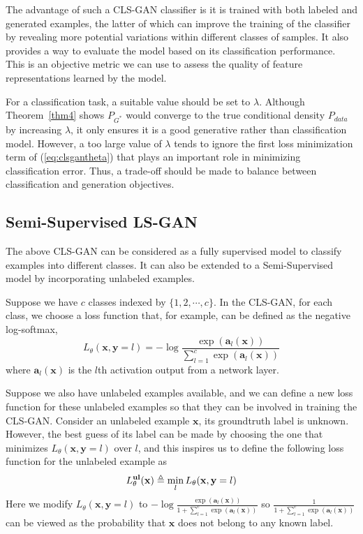 The advantage of such a CLS-GAN classifier is it is trained with both labeled and generated examples, the latter of which can improve the training of the classifier by revealing more potential variations within different classes of samples. It also provides a way to evaluate the model based on its classification performance. This is an objective metric we can use to assess the quality of feature representations learned by the model.

For a classification task, a suitable value should be set to $\lambda$.  Although Theorem~\ref{thm4} shows $P_{G^*}$ would converge to the true conditional density $P_{data}$ by increasing $\lambda$, it only ensures it is a good generative rather than classification model.  However, a too large value of $\lambda$ tends to ignore the first loss minimization term of (\ref{eq:clsgantheta}) that plays an important role in minimizing classification error.  Thus, a trade-off should be made to balance between classification and generation objectives.


\subsection{Semi-Supervised LS-GAN}\label{sec:ssl}
The above CLS-GAN can be considered as a fully supervised model to classify examples into different classes.
It can also be extended to a Semi-Supervised model by incorporating unlabeled examples.

Suppose we have $c$ classes indexed by $\{1,2,\cdots,c\}$. In the CLS-GAN, for each class, we choose a loss function that, for example, can be defined as the negative log-softmax,
$$
L_\theta(\mathbf x, \mathbf y=l) = -\log\dfrac{\exp(\mathbf a_l(\mathbf x))}{\sum_{l=1}^c \exp(\mathbf a_l(\mathbf x))}
$$
where $\mathbf a_l(\mathbf x)$ is the $l$th activation output from a network layer.

Suppose we also have unlabeled examples available, and we can define a new loss function for these unlabeled examples so that they can be involved in training the CLS-GAN. Consider an unlabeled example $\mathbf x$, its groundtruth label is unknown.  However, the best guess of its label can be made by choosing the one that minimizes $L_\theta(\mathbf x, \mathbf y=l)$ over $l$, and this inspires us to define the following loss function for the unlabeled example as
$$
L_\theta^{\bf ul}(\mathbf x)\triangleq\min_l L_\theta(\mathbf x, \mathbf y=l)
$$
Here we modify $L_\theta(\mathbf x, \mathbf y=l)$ to $-\log\frac{\exp(\mathbf a_l(\mathbf x))}{1+\sum_{l=1}^c \exp(\mathbf a_l(\mathbf x))}$ so $\frac{1}{1+\sum_{l=1}^c \exp(\mathbf a_l(\mathbf x))}$ can be viewed as the probability that $\mathbf x$ does not belong to any known label.

